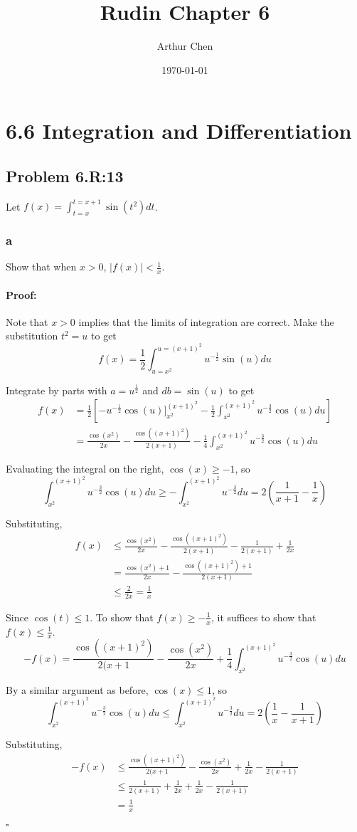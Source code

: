 \documentclass{article}
\author{Arthur Chen}
\title{Rudin Chapter 6}
\date{\today}
\newenvironment{proof}{\paragraph{Proof:}}{\hfill$\square$}
\begin{document}
\section*{6.6 Integration and Differentiation}

\subsection*{Problem 6.R:13}
Let $f(x) = \int_{t=x}^{t=x+1} \sin(t^2)dt$.
\subsubsection*{a}
Show that when $x>0$, $|f(x)| < \frac{1}{x}$. 

\begin{proof}
Note that $x>0$ implies that the limits of integration are correct. Make the substitution $t^2 = u$ to get
\[
f(x) = \frac{1}{2} \int_{u = x^2}^{u = (x+1)^2} u^{-\frac{1}{2}} \sin(u)du
\]

Integrate by parts with $a = u^{\frac{1}{2}}$ and $db = \sin(u)$ to get
\begin{align*}
f(x) &= \frac{1}{2}
\left[
-u^{-\frac{1}{2}}\cos(u)]_{x^2}^{(x+1)^2}
-\frac{1}{2} \int_{x^2}^{(x+1)^2} u^{-\frac{3}{2}} \cos(u)du
\right] \\
&= \frac{\cos(x^2)}{2x} - \frac{\cos((x+1)^2)}{2(x+1)} - \frac{1}{4} \int_{x^2}^{(x+1)^2} u^{-\frac{3}{2}} \cos(u)du
\end{align*}

Evaluating the integral on the right, $\cos(x) \geq -1$, so
\[
\int_{x^2}^{(x+1)^2} u^{-\frac{3}{2}} \cos(u)du
\geq - \int_{x^2}^{(x+1)^2} u^{-\frac{3}{2}} du
= 2 \left(\frac{1}{x+1} - \frac{1}{x} \right)
\]

Substituting,
\begin{align*}
f(x) &\leq \frac{\cos(x^2)}{2x} - \frac{\cos((x+1)^2)}{2(x+1)} - \frac{1}{2(x+1)} + \frac{1}{2x} \\
&= \frac{\cos(x^2) + 1}{2x} - \frac{\cos((x+1)^2) + 1}{2(x+1)} \\
& \leq \frac{2}{2x} = \frac{1}{x}
\end{align*}

Since $\cos(t) \leq 1$. To show that $f(x) \geq -\frac{1}{x}$, it suffices to show that $f(x) \leq \frac{1}{x}$.
\[
-f(x) = \frac{\cos((x+1)^2)}{2(x+1} - \frac{\cos(x^2)}{2x} + \frac{1}{4} \int_{x^2}^{(x+1)^2} u^{-\frac{3}{2}} \cos(u)du
\]

By a similar argument as before, $\cos(x) \leq 1$, so
\[
\int_{x^2}^{(x+1)^2} u^{-\frac{3}{2}} \cos(u)du
\leq \int_{x^2}^{(x+1)^2} u^{-\frac{3}{2}} du
= 2 \left(\frac{1}{x} - \frac{1}{x+1} \right)
\]

Substituting,
\begin{align*}
-f(x) &\leq \frac{\cos((x+1)^2)}{2(x+1} - \frac{\cos(x^2)}{2x} + \frac{1}{2x} - \frac{1}{2(x+1)} \\
&\leq \frac{1}{2(x+1)} + \frac{1}{2x} + \frac{1}{2x} - \frac{1}{2(x+1)} \\
&= \frac{1}{x}
\end{align*}

\end{proof}
\end{document}
